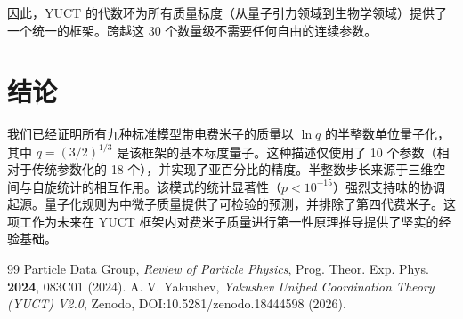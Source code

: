 \documentclass[12pt,a4paper]{article}
\begin{document}
	因此，YUCT 的代数环为所有质量标度（从量子引力领域到生物学领域）提供了一个统一的框架。跨越这 30 个数量级不需要任何自由的连续参数。
	
	\section{结论}
	
	我们已经证明所有九种标准模型带电费米子的质量以 $\ln q$ 的半整数单位量子化，其中 $q = (3/2)^{1/3}$ 是该框架的基本标度量子。这种描述仅使用了 10 个参数（相对于传统参数化的 18 个），并实现了亚百分比的精度。半整数步长来源于三维空间与自旋统计的相互作用。该模式的统计显著性（$p < 10^{-15}$）强烈支持味的协调起源。量子化规则为中微子质量提供了可检验的预测，并排除了第四代费米子。这项工作为未来在 YUCT 框架内对费米子质量进行第一性原理推导提供了坚实的经验基础。
	
	\begin{thebibliography}{99}
		 Particle Data Group, \textit{Review of Particle Physics}, Prog. Theor. Exp. Phys. \textbf{2024}, 083C01 (2024).
		 A. V. Yakushev, \textit{Yakushev Unified Coordination Theory (YUCT) V2.0}, Zenodo, DOI:10.5281/zenodo.18444598 (2026).
	\end{thebibliography}
	
\end{document}
